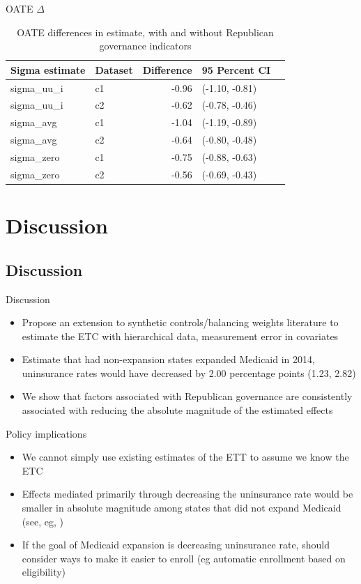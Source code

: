 \documentclass[hyperref={pdfpagelabels=false}]{beamer}
\begin{document}
\begin{frame}{OATE $\Delta$}
\begin{table}[ht]
\centering
\begin{tabular}{llrll}
  \toprule
Sigma estimate & Dataset & Difference & 95 Percent CI\\ 
  \midrule
  sigma\_uu\_i & c1 & -0.96 & (-1.10, -0.81) \\ 
  sigma\_uu\_i & c2 & -0.62 & (-0.78, -0.46) \\ 
  sigma\_avg & c1 & -1.04 & (-1.19, -0.89) \\ 
  sigma\_avg & c2 & -0.64 & (-0.80, -0.48) \\ 
  sigma\_zero & c1 & -0.75 & (-0.88, -0.63) \\ 
  sigma\_zero & c2 & -0.56 & (-0.69, -0.43) \\ 
   \bottomrule
\end{tabular}
\caption{OATE differences in estimate, with and without Republican governance indicators}
\label{tab:oaterepubdiff}
\end{table}
\end{frame}

\section{Discussion}

\subsection{Discussion}

\begin{frame}{Discussion}
\begin{itemize}
    \item Propose an extension to synthetic controls/balancing weights literature to estimate the ETC with hierarchical data, measurement error in covariates \bigskip
    \item Estimate that had non-expansion states expanded Medicaid in 2014, uninsurance rates would have decreased by 2.00 percentage points (1.23, 2.82) \bigskip
    \item We show that factors associated with Republican governance are consistently associated with reducing the absolute magnitude of the estimated effects
\end{itemize}
\end{frame}

\begin{frame}{Policy implications}
    \begin{itemize}
        \item We cannot simply use existing estimates of the ETT to assume we know the ETC \bigskip
        \item Effects mediated primarily through decreasing the uninsurance rate would be smaller in absolute magnitude among states that did not expand Medicaid (see, eg, \cite{wherry2016early}) \bigskip
        \item If the goal of Medicaid expansion is decreasing uninsurance rate, should consider ways to make it easier to enroll (eg automatic enrollment based on eligibility)
    \end{itemize}
\end{frame}
\end{document}
